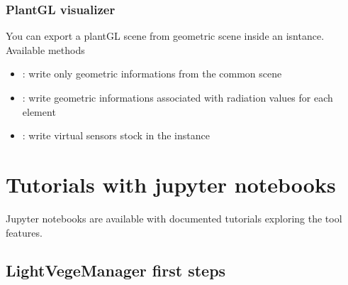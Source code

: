 \documentclass[letterpaper,10pt,english]{sphinxmanual}
\begin{document}
\subsubsection{PlantGL visualizer}
\label{\detokenize{others:plantgl-visualizer}}
\sphinxAtStartPar
You can export a plantGL scene from geometric scene inside an isntance. Available methods
\begin{itemize}
\item {} 
\sphinxAtStartPar
{}: write only geometric informations from the common scene

\item {} 
\sphinxAtStartPar
{}: write geometric informations associated with radiation values for each element

\item {} 
\sphinxAtStartPar
{}: write virtual sensors stock in the instance

\end{itemize}

\sphinxstepscope


\section{Tutorials with jupyter notebooks}
\label{\detokenize{tutorials:tutorials-with-jupyter-notebooks}}\label{\detokenize{tutorials:tutorials}}\label{\detokenize{tutorials::doc}}
\sphinxAtStartPar
Jupyter notebooks are available with documented tutorials exploring the tool features.

\sphinxstepscope


\subsection{LightVegeManager first steps}
\label{\detokenize{tool_basics:LightVegeManager-first-steps}}\label{\detokenize{tool_basics::doc}}
\end{document}
